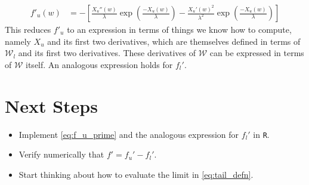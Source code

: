 \documentclass{article}
\newcommand{\sW}{\mathscr{W}}
\begin{document}
\begin{align}
    f'_u(w) &= - \left[ \frac{X_u''(w)}{\lambda} \exp \left( \frac{-X_u(w)}{\lambda} \right) - \frac{X_u'(w)^2}{\lambda^2} \exp \left( \frac{-X_u(w)}{\lambda} \right)\right] \label{eq:f_u_prime}
\end{align}
%
This reduces $f'_u$ to an expression in terms of things we know how to compute, namely $X_u$ and its first two derivatives, which are themselves defined in terms of $\sW_l$ and its first two derivatives. These derivatives of $\sW$ can be expressed in terms of $\sW$ itself. An analogous expression holds for $f_l'$.

\section*{Next Steps}
\begin{itemize}
    \item Implement \ref{eq:f_u_prime} and the analogous expression for $f_l'$ in \texttt{R}.
    \item Verify numerically that $f' = f_u' - f_l'$.
    \item Start thinking about how to evaluate the limit in \eqref{eq:tail_defn}.
\end{itemize}
        



\end{document}
